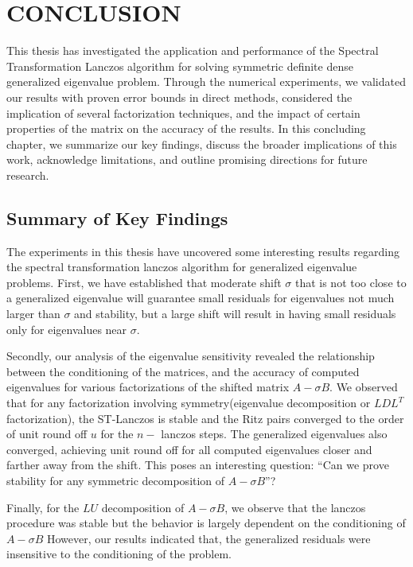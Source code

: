 \chapter{CONCLUSION}
This thesis has investigated the application and performance of the Spectral Transformation Lanczos algorithm for solving symmetric definite dense generalized eigenvalue problem. Through the numerical experiments, we validated our results with proven error bounds in direct methods, considered the implication of several factorization techniques, and the impact of certain properties of the matrix on the accuracy of the results. In this concluding chapter, we summarize our key findings, discuss the broader implications of this work, acknowledge limitations, and outline promising directions for future research.

\section{Summary of Key Findings}
The experiments in this thesis have uncovered some interesting results regarding the spectral transformation lanczos algorithm for generalized eigenvalue problems. First, we have established that moderate shift $\sigma$ that is not too close to a generalized eigenvalue will guarantee small residuals for eigenvalues not much larger than $\sigma$ and stability, but a large shift will result in having small residuals only for eigenvalues near $\sigma$.

Secondly, our analysis of the eigenvalue sensitivity revealed the relationship between the conditioning of the matrices, and the accuracy of computed eigenvalues for various factorizations of the shifted matrix $A-\sigma B$. We observed that for any factorization involving symmetry(eigenvalue decomposition or $LDL^T$ factorization), the ST-Lanczos is stable and the Ritz pairs converged to the order of unit round off $u$ for the $n-$ lanczos steps. The generalized eigenvalues also converged, achieving unit round off for all computed eigenvalues closer and farther away from the shift. This poses an interesting question: ``Can we prove stability for any symmetric decomposition of $A - \sigma B$''?

Finally, for the $LU$ decomposition of $A - \sigma B$, we observe that the lanczos procedure was stable but the behavior is largely dependent on the conditioning of $A-\sigma B$ However, our results indicated that, the generalized residuals were insensitive to the conditioning of the problem.

